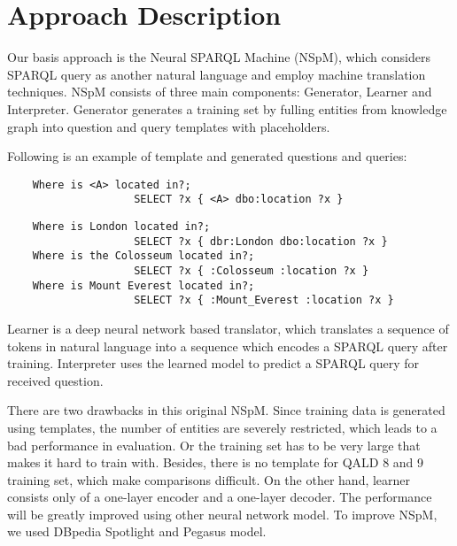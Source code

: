 
\section{Approach Description}

Our basis approach is the Neural SPARQL Machine (NSpM)\cite{soru-marx-nampi2018},
which considers SPARQL query as another natural language and employ machine translation techniques. 
NSpM consists of three main components: 
Generator, Learner and Interpreter. 
Generator generates a training set
by fulling entities from knowledge graph into question and query templates with placeholders. 

Following is an example of template and generated questions and queries:

\begin{verbatim}
    Where is <A> located in?; 
                    SELECT ?x { <A> dbo:location ?x }
\end{verbatim}

\begin{verbatim}
    Where is London located in?; 
                    SELECT ?x { dbr:London dbo:location ?x }
    Where is the Colosseum located in?; 
                    SELECT ?x { :Colosseum :location ?x }
    Where is Mount Everest located in?; 
                    SELECT ?x { :Mount_Everest :location ?x }
\end{verbatim}

Learner is a deep neural network based translator, 
which translates a sequence of tokens in natural language
into a sequence which encodes a SPARQL query after training.
Interpreter uses the learned model to predict a SPARQL query for received question.

There are two drawbacks in this original NSpM.
Since training data is generated using templates, 
the number of entities are severely restricted,
which leads to a bad performance in evaluation.
Or the training set has to be very large
that makes it hard to train with. 
Besides, there is no template for QALD 8 and 9 training set,
which make comparisons difficult. 
On the other hand, 
learner consists only of a one-layer encoder and a one-layer decoder.
The performance will be greatly improved using other neural network model.
To improve NSpM, we used DBpedia Spotlight and Pegasus model. 


